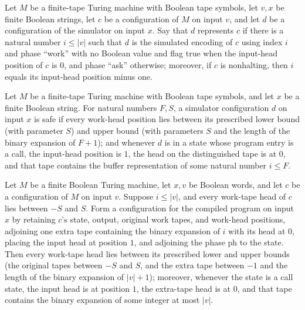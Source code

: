 \begin{definition}
\label{Complexity.LogProg.OIS.Represents}
\leanok
{}
Let $M$ be a finite-tape Turing machine with Boolean tape symbols, let $v,x$ be finite
Boolean strings, let $c$ be a configuration of $M$ on input $v$, and let $d$ be a
configuration of the simulator on input $x$. Say that $d$ represents $c$ if there is a
natural number $i\leq |v|$ such that $d$ is the simulated encoding of $c$ using index
$i$ and phase “work” with no Boolean value and flag true when the input-head position of
$c$ is $0$, and phase “ask” otherwise; moreover, if $c$ is nonhalting, then $i$ equals
its input-head position minus one.
\end{definition}

\begin{definition}
\label{Complexity.LogProg.OIS.Safe}
\leanok
{}
Let $M$ be a finite-tape Turing machine with Boolean tape symbols, and let $x$ be a
finite Boolean string. For natural numbers $F,S$, a simulator configuration $d$ on input
$x$ is safe if every work-head position lies between its prescribed lower bound (with
parameter $S$) and upper bound (with parameters $S$ and the length of the binary
expansion of $F+1$); and whenever $d$ is in a state whose program entry is a call, the
input-head position is $1$, the head on the distinguished tape is at $0$, and that tape
contains the buffer representation of some natural number $i\leq F$.
\end{definition}

\begin{theorem}
\label{Complexity.LogProg.OIS.imageCfg_safe}
\leanok
{}
Let $M$ be a finite Boolean Turing machine, let $x,v$ be Boolean words, and let $c$ be a
configuration of $M$ on input $v$. Suppose $i\le |v|$, and every work-tape head of $c$
lies between $-S$ and $S$. Form a configuration for the compiled program on input $x$ by
retaining $c$'s state, output, original work tapes, and work-head positions, adjoining
one extra tape containing the binary expansion of $i$ with its head at $0$, placing the
input head at position $1$, and adjoining the phase $\mathrm{ph}$ to the state. Then
every work-tape head lies between its prescribed lower and upper bounds (the original
tapes between $-S$ and $S$, and the extra tape between $-1$ and the length of the binary
expansion of $|v|+1$); moreover, whenever the state is a call state, the input head is
at position $1$, the extra-tape head is at $0$, and that tape contains the binary
expansion of some integer at most $|v|$.
\end{theorem}

